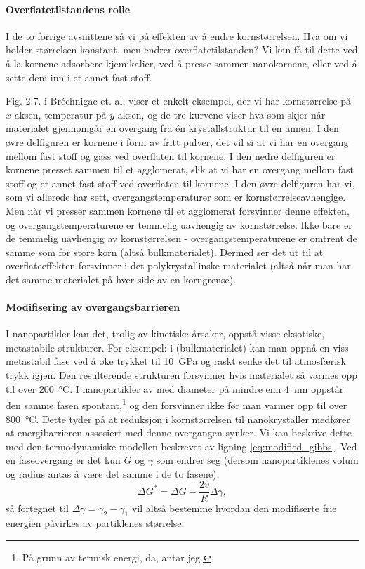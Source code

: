 \paragraph{Overflatetilstandens rolle} I de to forrige avsnittene så vi på effekten av å endre kornstørrelsen. Hva om vi holder størrelsen konstant, men endrer overflatetilstanden? Vi kan få til dette ved å la kornene adsorbere kjemikalier, ved å presse sammen nanokornene, eller ved å sette dem inn i et annet fast stoff. 

Fig. 2.7. i Bréchnigac et. al. viser et enkelt eksempel, der vi har kornstørrelse på $x$-aksen, temperatur på $y$-aksen, og de tre kurvene viser hva som skjer når materialet gjennomgår en overgang fra én krystallstruktur til en annen. I den øvre delfiguren er kornene i form av fritt pulver, det vil si at vi har en overgang mellom fast stoff og gass ved overflaten til kornene. I den nedre delfiguren er kornene presset sammen til et agglomerat, slik at vi har en overgang mellom fast stoff og et annet fast stoff ved overflaten til kornene. I den øvre delfiguren har vi, som vi allerede har sett, overgangstemperaturer som er kornstørrelseavhengige. Men når vi presser sammen kornene til et agglomerat forsvinner denne effekten, og overgangstemperaturene er temmelig uavhengig av kornstørrelse. Ikke bare er de temmelig uavhengig av kornstørrelsen - overgangstemperaturene er omtrent de samme som for store korn (altså bulkmaterialet). Dermed ser det ut til at overflateeffekten forsvinner i det polykrystallinske materialet (altså når man har det samme materialet på hver side av en korngrense).

\paragraph{Modifisering av overgangsbarrieren} I nanopartikler kan det, trolig av kinetiske årsaker, oppstå visse eksotiske, metastabile strukturer. For eksempel: i  (bulkmaterialet) kan man oppnå en viss metastabil fase ved å øke trykket til \SI{10}{\giga\pascal} og raskt senke det til atmosfærisk trykk igjen. Den resulterende strukturen forsvinner hvis materialet så varmes opp til over \SI{200}{\celsius}. I nanopartikler av  med diameter på mindre enn \SI{4}{\nano\meter} oppstår den samme fasen spontant,\footnote{På grunn av termisk energi, da, antar jeg.} og den forsvinner ikke før man varmer opp til over \SI{800}{\celsius}. Dette tyder på at reduksjon i kornstørrelsen til nanokrystaller medfører at energibarrieren assosiert med denne overgangen synker. Vi kan beskrive dette med den termodynamiske modellen beskrevet av ligning \eqref{eq:modified_gibbs}. Ved en faseovergang er det kun $G$ og $\gamma$ som endrer seg (dersom nanopartiklenes volum og radius antas å være det samme i de to fasene),
\begin{equation}
	\label{eq:particle_delta_g}
	\Delta G^* = \Delta G - \frac{2v}{R}\Delta\gamma,
\end{equation}
så fortegnet til $\Delta \gamma = \gamma_2-\gamma_1$ vil altså bestemme hvordan den modifiserte frie energien påvirkes av partiklenes størrelse. 

